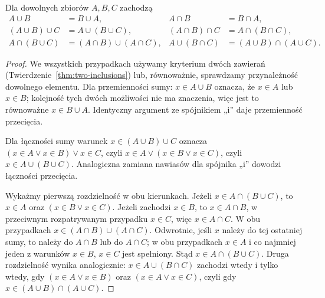 \begin{center}
\end{center}
\begin{twierdzenie}
\label{thm:set-lattice}
Dla dowolnych zbiorów $A,B,C$ zachodzą
\begin{align*}
A\cup B&=B\cup A,& A\cap B&=B\cap A,\\
(A\cup B)\cup C&=A\cup(B\cup C),&
(A\cap B)\cap C&=A\cap(B\cap C),\\
A\cap(B\cup C)&=(A\cap B)\cup(A\cap C),&
A\cup(B\cap C)&=(A\cup B)\cap(A\cup C).
\end{align*}
\end{twierdzenie}
\begin{proof}
We wszystkich przypadkach używamy kryterium dwóch zawierań
(Twierdzenie~\ref{thm:two-inclusions}) lub, równoważnie, sprawdzamy
przynależność dowolnego elementu. Dla przemienności sumy:
$x\in A\cup B$ oznacza, że $x\in A$ lub $x\in B$; kolejność
tych dwóch możliwości nie ma znaczenia, więc jest to równoważne
$x\in B\cup A$. Identyczny argument ze spójnikiem „i” daje
przemienność przecięcia.

Dla łączności sumy warunek $x\in (A\cup B)\cup C$
oznacza $(x\in A\lor x\in B)\lor x\in C$, czyli
$x\in A\lor(x\in B\lor x\in C)$, czyli
$x\in A\cup(B\cup C)$. Analogiczna zamiana nawiasów dla
spójnika „i” dowodzi łączności przecięcia.

Wykażmy pierwszą rozdzielność w obu kierunkach. Jeżeli
$x\in A\cap(B\cup C)$, to $x\in A$ oraz
$(x\in B\lor x\in C)$. Jeżeli zachodzi $x\in B$,
to $x\in A\cap B$, w przeciwnym rozpatrywanym przypadku
$x\in C$, więc $x\in A\cap C$. W obu przypadkach
$x\in(A\cap B)\cup(A\cap C)$. Odwrotnie, jeśli $x$ należy
do tej ostatniej sumy, to należy do $A\cap B$ lub do $A\cap C$;
w obu przypadkach $x\in A$ i co najmniej jeden z warunków
$x\in B$, $x\in C$ jest spełniony. Stąd
$x\in A\cap(B\cup C)$. Druga rozdzielność wynika analogicznie:
$x\in A\cup(B\cap C)$ zachodzi wtedy i tylko wtedy, gdy
$(x\in A\lor x\in B)$ oraz $(x\in A\lor x\in C)$,
czyli gdy $x\in(A\cup B)\cap(A\cup C)$.
\end{proof}

